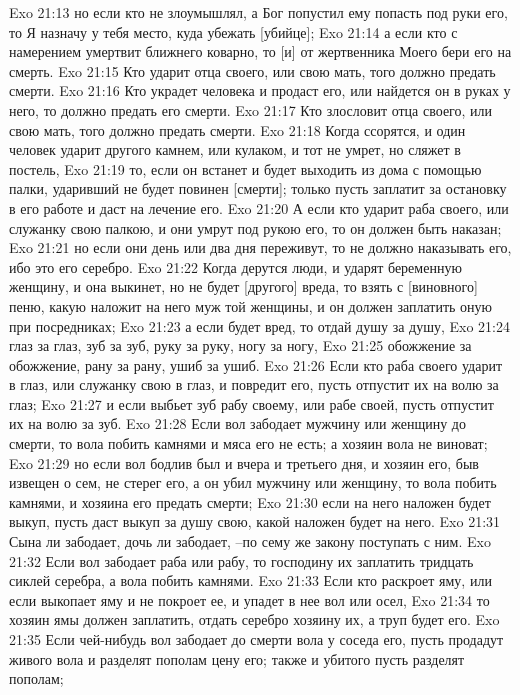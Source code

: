 Exo 21:13  но если кто не злоумышлял, а Бог попустил ему попасть под руки его, то Я назначу у тебя место, куда убежать [убийце];
Exo 21:14  а если кто с намерением умертвит ближнего коварно, то [и] от жертвенника Моего бери его на смерть.
Exo 21:15  Кто ударит отца своего, или свою мать, того должно предать смерти.
Exo 21:16  Кто украдет человека и продаст его, или найдется он в руках у него, то должно предать его смерти.
Exo 21:17  Кто злословит отца своего, или свою мать, того должно предать смерти.
Exo 21:18  Когда ссорятся, и один человек ударит другого камнем, или кулаком, и тот не умрет, но сляжет в постель,
Exo 21:19  то, если он встанет и будет выходить из дома с помощью палки, ударивший не будет повинен [смерти]; только пусть заплатит за остановку в его работе и даст на лечение его.
Exo 21:20  А если кто ударит раба своего, или служанку свою палкою, и они умрут под рукою его, то он должен быть наказан;
Exo 21:21  но если они день или два дня переживут, то не должно наказывать его, ибо это его серебро.
Exo 21:22  Когда дерутся люди, и ударят беременную женщину, и она выкинет, но не будет [другого] вреда, то взять с [виновного] пеню, какую наложит на него муж той женщины, и он должен заплатить оную при посредниках;
Exo 21:23  а если будет вред, то отдай душу за душу,
Exo 21:24  глаз за глаз, зуб за зуб, руку за руку, ногу за ногу,
Exo 21:25  обожжение за обожжение, рану за рану, ушиб за ушиб.
Exo 21:26  Если кто раба своего ударит в глаз, или служанку свою в глаз, и повредит его, пусть отпустит их на волю за глаз;
Exo 21:27  и если выбьет зуб рабу своему, или рабе своей, пусть отпустит их на волю за зуб.
Exo 21:28  Если вол забодает мужчину или женщину до смерти, то вола побить камнями и мяса его не есть; а хозяин вола не виноват;
Exo 21:29  но если вол бодлив был и вчера и третьего дня, и хозяин его, быв извещен о сем, не стерег его, а он убил мужчину или женщину, то вола побить камнями, и хозяина его предать смерти;
Exo 21:30  если на него наложен будет выкуп, пусть даст выкуп за душу свою, какой наложен будет на него.
Exo 21:31  Сына ли забодает, дочь ли забодает, --по сему же закону поступать с ним.
Exo 21:32  Если вол забодает раба или рабу, то господину их заплатить тридцать сиклей серебра, а вола побить камнями.
Exo 21:33  Если кто раскроет яму, или если выкопает яму и не покроет ее, и упадет в нее вол или осел,
Exo 21:34  то хозяин ямы должен заплатить, отдать серебро хозяину их, а труп будет его.
Exo 21:35  Если чей-нибудь вол забодает до смерти вола у соседа его, пусть продадут живого вола и разделят пополам цену его; также и убитого пусть разделят пополам;
